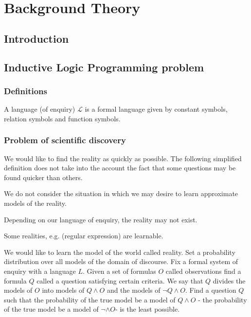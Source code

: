 
\chapter{Background Theory}

\label{ch:background}

\section{Introduction}

\section{Inductive Logic Programming problem}

\subsection{Definitions}

A language (of enquiry) $\mathcal{L}$ is a formal language given by constant symbols, relation symbols and function symbols.



\subsection{Problem of scientific discovery}
We would like to find the reality as quickly as possible. The following simplified definition does not take into the account the fact that some questions may be found quicker than others.

We do not consider the situation in which we may desire to learn approximate models of the reality.

Depending on our language of enquiry, the reality may not exist.

Some realities, e.g. (regular expression) are learnable.

We would like to learn the model of the world called reality. Set a probability distribution over all models of the domain of discourse. Fix a formal system of enquiry with a language $L$. Given a set of formulas $O$ called observations find a formula $Q$ called a question satisfying certain criteria.
We say that $Q$ divides the models of $O$ into models of $Q \wedge O$ and the models of $\neg Q \wedge O$. Find a question $Q$ such that the probability of the true model be a model of $Q \wedge O$ - the probability of the true model be a model of $\neg \wedge O$- is the least possible.

